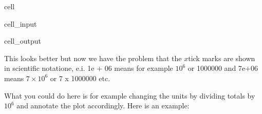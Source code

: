 \documentclass[letterpaper,10pt,english]{jupyterBook}
\begin{document}
\begin{sphinxuseclass}{cell}\begin{sphinxVerbatimInput}

\begin{sphinxuseclass}{cell_input}
\begin{sphinxVerbatim}[commandchars=\\\{\}]
\end{sphinxVerbatim}

\end{sphinxuseclass}\end{sphinxVerbatimInput}
\begin{sphinxVerbatimOutput}

\begin{sphinxuseclass}{cell_output}
\noindent{}

\end{sphinxuseclass}\end{sphinxVerbatimOutput}

\end{sphinxuseclass}
\sphinxAtStartPar
This looks better but now we have the problem that the \(x\)\sphinxhyphen{}tick marks are shown in scientific notatione, e.i. 1e + 06 means for example \(10^6\) or 1000000 and 7e+06 means \(7 \times 10^6\) or 7  x 1000000 etc.

\sphinxAtStartPar
What you could do here is for example changing the units by dividing totals by \(10^6\) and annotate the plot
accordingly. Here is an example:
\end{document}
